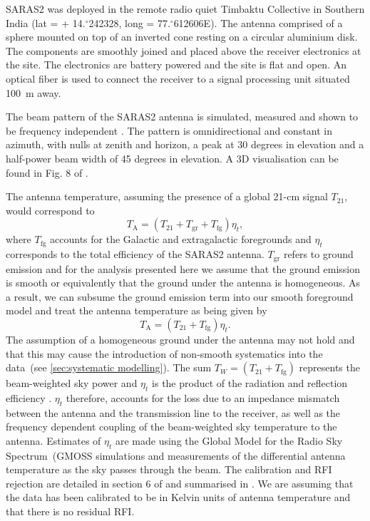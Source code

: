SARAS2 was deployed in the remote radio quiet Timbaktu Collective in Southern India (lat = + 14.$^{\circ}$242328, long = 77.$^{\circ}$612606E). The antenna comprised of a sphere mounted on top of an inverted cone resting on a circular aluminium disk. The components are smoothly joined and placed above the receiver electronics at the site. The electronics are battery powered and the site is flat and open. An optical fiber is used to connect the receiver to a signal processing unit situated 100~m away.

The beam pattern of the SARAS2 antenna is simulated, measured and shown to be frequency independent \citep{SARAS2_radiometer_2018}. The pattern is omnidirectional and constant in azimuth, with nulls at zenith and horizon, a peak at 30 degrees in elevation and a half-power beam width of 45 degrees in elevation. A 3D visualisation can be found in Fig. 8 of \cite{Sathyanarayana_msf_2017}. 

The antenna temperature, assuming the presence of a global 21-cm signal $T_{21}$, would correspond to
\begin{equation}
    T_\mathrm{A} = (T_{21} + T_\mathrm{gr} + T_\mathrm{fg})\eta_t,
\end{equation}
where $T_\mathrm{fg}$ accounts for the Galactic and extragalactic foregrounds and $\eta_t$ corresponds to the total efficiency of the SARAS2 antenna. $T_\mathrm{gr}$ refers to ground emission and for the analysis presented here we assume that the ground emission is smooth or equivalently that the ground under the antenna is homogeneous. As a result, we can subsume the ground emission term into our smooth foreground model and treat the antenna temperature as being given by
\begin{equation}
    T_\mathrm{A} = (T_{21} + T_\mathrm{fg})\eta_t.
    \label{eq:components}
\end{equation}
The assumption of a homogeneous ground under the antenna may not hold and that this may cause the introduction of non-smooth systematics into the data~(see \cref{sec:systematic modelling}). The sum $T_W = (T_{21} + T_\mathrm{fg})$ represents the beam-weighted sky power and $\eta_t$ is the product of the radiation and reflection efficiency \citep{SARAS2_radiometer_2018}. $\eta_t$ therefore, accounts for the loss due to an impedance mismatch between the antenna and the transmission line to the receiver, as well as the frequency dependent coupling of the beam-weighted sky temperature to the antenna. Estimates of $\eta_t$ are made using the Global Model for the Radio Sky Spectrum~(GMOSS simulations and measurements of the differential antenna temperature as the sky passes through the beam. The calibration and RFI rejection are detailed in section 6 of \cite{SARAS2_radiometer_2018} and summarised in \cite{Singh_saras2_2017}. We are assuming that the data has been calibrated to be in Kelvin units of antenna temperature and that there is no residual RFI.

